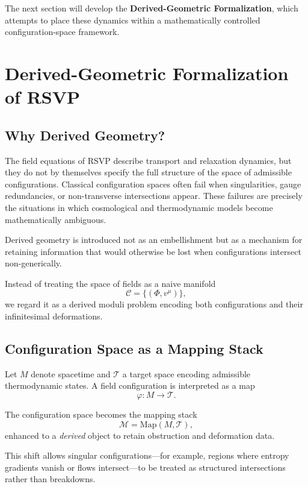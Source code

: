 \documentclass[12pt]{article}
\begin{document}
\bigskip

The next section will develop the \textbf{Derived-Geometric Formalization}, which attempts to place these dynamics within a mathematically controlled configuration-space framework.

\section{Derived-Geometric Formalization of RSVP}

\subsection{Why Derived Geometry?}

The field equations of RSVP describe transport and relaxation dynamics, but they do not by themselves specify the full structure of the space of admissible configurations. Classical configuration spaces often fail when singularities, gauge redundancies, or non-transverse intersections appear. These failures are precisely the situations in which cosmological and thermodynamic models become mathematically ambiguous.

Derived geometry is introduced not as an embellishment but as a mechanism for retaining information that would otherwise be lost when configurations intersect non-generically.

Instead of treating the space of fields as a naive manifold
\[
\mathcal{C} = \{ (\Phi, v^\mu) \},
\]
we regard it as a derived moduli problem encoding both configurations and their infinitesimal deformations.

\subsection{Configuration Space as a Mapping Stack}

Let $M$ denote spacetime and $\mathcal{T}$ a target space encoding admissible thermodynamic states. A field configuration is interpreted as a map
\[
\varphi : M \longrightarrow \mathcal{T}.
\]

The configuration space becomes the mapping stack
\[
\mathcal{M} = \mathrm{Map}(M,\mathcal{T}),
\]
enhanced to a \emph{derived} object to retain obstruction and deformation data.

This shift allows singular configurations---for example, regions where entropy gradients vanish or flows intersect---to be treated as structured intersections rather than breakdowns.
\end{document}
